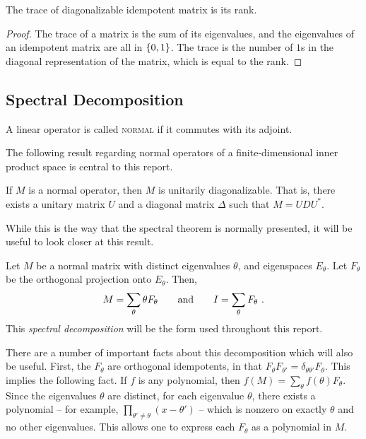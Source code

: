 \documentclass{report}
\begin{document}
      \begin{prop}
        The trace of diagonalizable idempotent matrix is its rank.
      \end{prop}

      \begin{proof}
        The trace of a matrix is the sum of its eigenvalues, and the eigenvalues
        of an idempotent matrix are all in $\left\lbrace 0, 1 \right\rbrace$.  The trace is the
        number of $1$s in the diagonal representation of the matrix, which is
        equal to the rank.
      \end{proof}

    \subsection{Spectral Decomposition}

      \begin{defn}
        A linear operator is called \textsc{normal} if it commutes with its
        adjoint.
      \end{defn}

      The following result regarding normal operators of a finite-dimensional
      inner product space is central to this report.

      \begin{thm}
        If $M$ is a normal operator, then $M$ is unitarily diagonalizable.  That
        is, there exists a unitary matrix $U$ and a diagonal matrix $\Delta$
        such that $M = UDU^*$.
      \end{thm}

      While this is the way that the spectral theorem is normally presented, it
      will be useful to look closer at this result.

      Let $M$ be a normal matrix with distinct eigenvalues $\theta$, and
      eigenspaces $E_\theta$.  Let $F_\theta$ be the orthogonal projection onto
      $E_\theta$.  Then,
      $$
        M = \sum_\theta \theta F_\theta \quad\quad\text{and}\quad\quad
        I = \sum_\theta F_\theta \ .
      $$
      This \textit{spectral decomposition} will be the form used throughout this
      report.

      There are a number of important facts about this decomposition which will
      also be useful.  First, the $F_\theta$ are orthogonal idempotents, in that
      $F_\theta F_{\theta'} = \delta_{\theta \theta'} F_\theta$.  This implies
      the following fact.  If $f$ is any polynomial, then $f(M) = \sum_\theta
      f(\theta) F_\theta$.  Since the eigenvalues $\theta$ are distinct, for
      each eigenvalue $\theta$, there exists a polynomial -- for example,
      $\prod_{\theta' \neq \theta} (x - \theta')$ -- which is nonzero on exactly
      $\theta$ and no other eigenvalues.  This allows one to express each
      $F_\theta$ as a polynomial in $M$.
\end{document}
